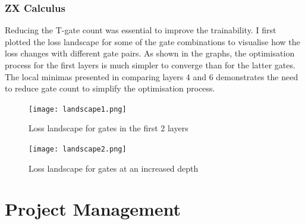 \documentclass[12pt]{article}
\numberwithin{equation}{section}
\begin{document}
\subsubsection{ZX Calculus}
Reducing the T-gate count was essential to improve the trainability. 
I first plotted the loss landscape for some of the gate combinations to visualise 
how the loss changes with different gate pairs. As shown in the graphs, the 
optimisation process for the first layers is much simpler to converge than for 
the latter gates. The local minimas presented in comparing layers 4 and 6 
demonstrates the need to reduce gate count to simplify the optimisation process. 
\begin{figure}[h!]
    \centering
    \begin{minipage}{0.48\textwidth}
        \centering
        \texttt{[image: landscape1.png]}
        \caption{Loss landscape for gates in the first 2 layers}
        \label{fig:landscape1}
    \end{minipage}
    \hfill
    \begin{minipage}{0.48\textwidth}
        \centering
        \texttt{[image: landscape2.png]}
        \caption{Loss landscape for gates at an increased depth}
        \label{fig:landscape2}
    \end{minipage}
\end{figure}

\newpage 
\section{Project Management}

\newpage
\end{document}
